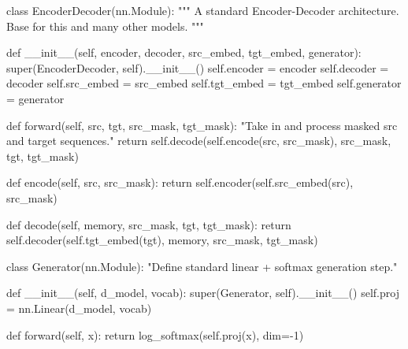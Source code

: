 \documentclass[
  letterpaper,
  DIV=11,
  numbers=noendperiod]{scrreprt}
\newenvironment{Shaded}{\begin{snugshade}}{\end{snugshade}}
\newcommand{\BuiltInTok}[1]{\textcolor[rgb]{0.00,0.23,0.31}{#1}}
\newcommand{\CommentTok}[1]{\textcolor[rgb]{0.37,0.37,0.37}{#1}}
\newcommand{\ControlFlowTok}[1]{\textcolor[rgb]{0.00,0.23,0.31}{#1}}
\newcommand{\DecValTok}[1]{\textcolor[rgb]{0.68,0.00,0.00}{#1}}
\newcommand{\FunctionTok}[1]{\textcolor[rgb]{0.28,0.35,0.67}{#1}}
\newcommand{\KeywordTok}[1]{\textcolor[rgb]{0.00,0.23,0.31}{#1}}
\newcommand{\NormalTok}[1]{\textcolor[rgb]{0.00,0.23,0.31}{#1}}
\newcommand{\OperatorTok}[1]{\textcolor[rgb]{0.37,0.37,0.37}{#1}}
\newcommand{\VariableTok}[1]{\textcolor[rgb]{0.07,0.07,0.07}{#1}}
\begin{document}
\begin{Shaded}
\begin{Highlighting}[]
\KeywordTok{class}\NormalTok{ EncoderDecoder(nn.Module):}
    \CommentTok{"""}
\CommentTok{    A standard Encoder{-}Decoder architecture. Base for this and many}
\CommentTok{    other models.}
\CommentTok{    """}

    \KeywordTok{def} \FunctionTok{\_\_init\_\_}\NormalTok{(}\VariableTok{self}\NormalTok{, encoder, decoder, src\_embed, tgt\_embed, generator):}
        \BuiltInTok{super}\NormalTok{(EncoderDecoder, }\VariableTok{self}\NormalTok{).}\FunctionTok{\_\_init\_\_}\NormalTok{()}
        \VariableTok{self}\NormalTok{.encoder }\OperatorTok{=}\NormalTok{ encoder}
        \VariableTok{self}\NormalTok{.decoder }\OperatorTok{=}\NormalTok{ decoder}
        \VariableTok{self}\NormalTok{.src\_embed }\OperatorTok{=}\NormalTok{ src\_embed}
        \VariableTok{self}\NormalTok{.tgt\_embed }\OperatorTok{=}\NormalTok{ tgt\_embed}
        \VariableTok{self}\NormalTok{.generator }\OperatorTok{=}\NormalTok{ generator}

    \KeywordTok{def}\NormalTok{ forward(}\VariableTok{self}\NormalTok{, src, tgt, src\_mask, tgt\_mask):}
        \CommentTok{"Take in and process masked src and target sequences."}
        \ControlFlowTok{return} \VariableTok{self}\NormalTok{.decode(}\VariableTok{self}\NormalTok{.encode(src, src\_mask), src\_mask, tgt, tgt\_mask)}

    \KeywordTok{def}\NormalTok{ encode(}\VariableTok{self}\NormalTok{, src, src\_mask):}
        \ControlFlowTok{return} \VariableTok{self}\NormalTok{.encoder(}\VariableTok{self}\NormalTok{.src\_embed(src), src\_mask)}

    \KeywordTok{def}\NormalTok{ decode(}\VariableTok{self}\NormalTok{, memory, src\_mask, tgt, tgt\_mask):}
        \ControlFlowTok{return} \VariableTok{self}\NormalTok{.decoder(}\VariableTok{self}\NormalTok{.tgt\_embed(tgt), memory, src\_mask, tgt\_mask)}
        
      
\KeywordTok{class}\NormalTok{ Generator(nn.Module):}
    \CommentTok{"Define standard linear + softmax generation step."}

    \KeywordTok{def} \FunctionTok{\_\_init\_\_}\NormalTok{(}\VariableTok{self}\NormalTok{, d\_model, vocab):}
        \BuiltInTok{super}\NormalTok{(Generator, }\VariableTok{self}\NormalTok{).}\FunctionTok{\_\_init\_\_}\NormalTok{()}
        \VariableTok{self}\NormalTok{.proj }\OperatorTok{=}\NormalTok{ nn.Linear(d\_model, vocab)}

    \KeywordTok{def}\NormalTok{ forward(}\VariableTok{self}\NormalTok{, x):}
        \ControlFlowTok{return}\NormalTok{ log\_softmax(}\VariableTok{self}\NormalTok{.proj(x), dim}\OperatorTok{={-}}\DecValTok{1}\NormalTok{)}
\end{Highlighting}
\end{Shaded}
\end{document}
